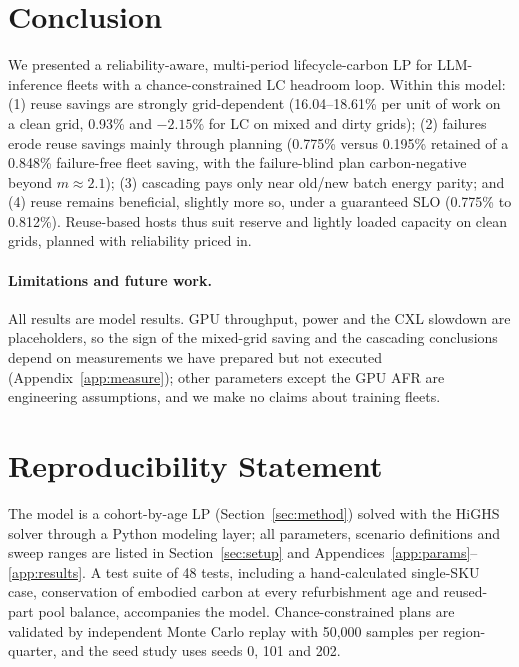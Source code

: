\documentclass{article} %
\begin{document}
\section{Conclusion}
\label{sec:conclusion}
We presented a reliability-aware, multi-period lifecycle-carbon LP for LLM-inference fleets with a chance-constrained LC headroom loop. Within this model: (1) reuse savings are strongly grid-dependent (16.04--18.61\% per unit of work on a clean grid, 0.93\% and $-2.15\%$ for LC on mixed and dirty grids); (2) failures erode reuse savings mainly through planning (0.775\% versus 0.195\% retained of a 0.848\% failure-free fleet saving, with the failure-blind plan carbon-negative beyond $m\approx 2.1$); (3) cascading pays only near old/new batch energy parity; and (4) reuse remains beneficial, slightly more so, under a guaranteed SLO (0.775\% to 0.812\%). Reuse-based hosts thus suit reserve and lightly loaded capacity on clean grids, planned with reliability priced in.

\paragraph{Limitations and future work.} All results are model results. GPU throughput, power and the CXL slowdown are placeholders, so the sign of the mixed-grid saving and the cascading conclusions depend on measurements we have prepared but not executed (Appendix~\ref{app:measure}); other parameters except the GPU AFR are engineering assumptions, and we make no claims about training fleets.

\section*{Reproducibility Statement}
The model is a cohort-by-age LP (Section~\ref{sec:method}) solved with the HiGHS solver through a Python modeling layer; all parameters, scenario definitions and sweep ranges are listed in Section~\ref{sec:setup} and Appendices~\ref{app:params}--\ref{app:results}. A test suite of 48 tests, including a hand-calculated single-SKU case, conservation of embodied carbon at every refurbishment age and reused-part pool balance, accompanies the model. Chance-constrained plans are validated by independent Monte Carlo replay with 50,000 samples per region-quarter, and the seed study uses seeds 0, 101 and 202.



\end{document}
